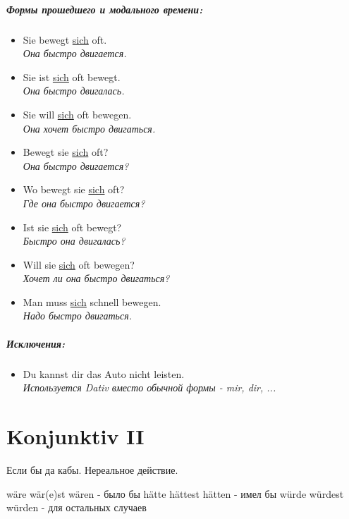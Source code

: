 \documentclass[12pt,a4paper]{report}
\newcommand{\satzew}[1]{\underline{#1}}
\newcommand{\ubersatze}[1]{\textit{#1}}
\begin{document}
\paragraph{Формы прошедшего и модального времени:}
\begin{itemize}
\item Sie bewegt \satzew{sich} oft.
~\\ \ubersatze{Она быстро двигается.}
\item Sie ist \satzew{sich} oft bewegt.
~\\ \ubersatze{Она быстро двигалась.}
\item Sie will \satzew{sich} oft bewegen.
~\\ \ubersatze{Она хочет быстро двигаться.}
\item Bewegt sie \satzew{sich} oft? 
~\\ \ubersatze{Она быстро двигается?}
\item Wo bewegt sie \satzew{sich} oft?
~\\ \ubersatze{Где она быстро двигается?}
\item Ist sie \satzew{sich} oft bewegt? 
~\\ \ubersatze{Быстро она двигалась?}
\item Will sie \satzew{sich} oft bewegen?
~\\ \ubersatze{Хочет ли она быстро двигаться?}
\item Man muss \satzew{sich} schnell bewegen.
~\\ \ubersatze{Надо быстро двигаться.}
\end{itemize}

\paragraph{Исключения:}
\begin{itemize}
\item Du  kannst dir das Auto nicht leisten.
~\\ \ubersatze{Используется Dativ вместо обычной формы - mir, dir, ...}
\end{itemize}

\chapter{Konjunktiv II}
Если бы да кабы. Нереальное действие.

wäre wär(e)st wären - было бы
hätte hättest hätten - имел бы
würde würdest würden - для остальных случаев
\end{document}
